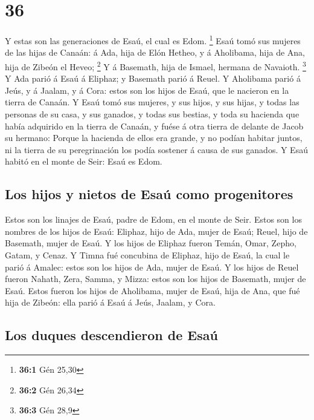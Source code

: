 \hypertarget{section-35}{%
\section{36}\label{section-35}}

 Y estas son las generaciones de Esaú, el cual es Edom.
\footnote{\textbf{36:1} Gén 25,30}  Esaú tomó sus mujeres
de las hijas de Canaán: á Ada, hija de Elón Hetheo, y á Aholibama, hija
de Ana, hija de Zibeón el Heveo; \footnote{\textbf{36:2} Gén 26,34}
 Y á Basemath, hija de Ismael, hermana de Navaioth.
\footnote{\textbf{36:3} Gén 28,9}  Y Ada parió á Esaú á
Eliphaz; y Basemath parió á Reuel.  Y Aholibama parió á
Jeús, y á Jaalam, y á Cora: estos son los hijos de Esaú, que le nacieron
en la tierra de Canaán.  Y Esaú tomó sus mujeres, y sus
hijos, y sus hijas, y todas las personas de su casa, y sus ganados, y
todas sus bestias, y toda su hacienda que había adquirido en la tierra
de Canaán, y fuése á otra tierra de delante de Jacob su hermano:
 Porque la hacienda de ellos era grande, y no podían
habitar juntos, ni la tierra de su peregrinación los podía sostener á
causa de sus ganados.  Y Esaú habitó en el monte de Seir:
Esaú es Edom.

\hypertarget{los-hijos-y-nietos-de-esauxfa-como-progenitores}{%
\subsection{Los hijos y nietos de Esaú como
progenitores}\label{los-hijos-y-nietos-de-esauxfa-como-progenitores}}

 Estos son los linajes de Esaú, padre de Edom, en el monte
de Seir.  Estos son los nombres de los hijos de Esaú:
Eliphaz, hijo de Ada, mujer de Esaú; Reuel, hijo de Basemath, mujer de
Esaú.  Y los hijos de Eliphaz fueron Temán, Omar, Zepho,
Gatam, y Cenaz.  Y Timna fué concubina de Eliphaz, hijo
de Esaú, la cual le parió á Amalec: estos son los hijos de Ada, mujer de
Esaú.  Y los hijos de Reuel fueron Nahath, Zera, Samma, y
Mizza: estos son los hijos de Basemath, mujer de Esaú. 
Estos fueron los hijos de Aholibama, mujer de Esaú, hija de Ana, que fué
hija de Zibeón: ella parió á Esaú á Jeús, Jaalam, y Cora.

\hypertarget{los-duques-descendieron-de-esauxfa}{%
\subsection{Los duques descendieron de
Esaú}\label{los-duques-descendieron-de-esauxfa}}

